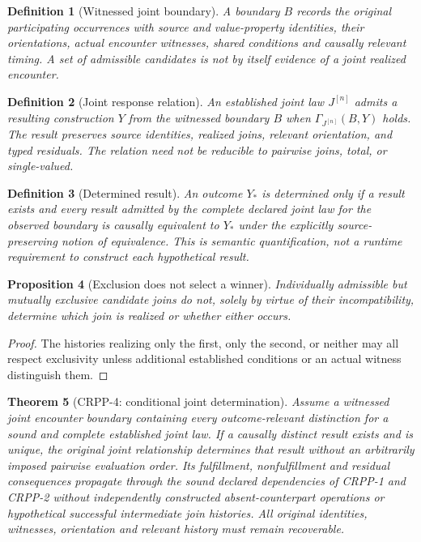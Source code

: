 \documentclass[11pt]{article}
\newtheorem{definition}{Definition}[section]
\newtheorem{proposition}[definition]{Proposition}
\newtheorem{theorem}[definition]{Theorem}
\begin{document}
\begin{definition}[Witnessed joint boundary]
A boundary $B$ records the original participating occurrences
with source and value-property identities, their orientations,
actual encounter witnesses, shared conditions and causally
relevant timing. A set of admissible candidates is not by
itself evidence of a joint realized encounter.
\end{definition}
\begin{definition}[Joint response relation]
An established joint law $J^{[n]}$ admits a resulting construction
$Y$ from the witnessed boundary $B$ when
$\Gamma_{J^{[n]}}(B,Y)$ holds. The result preserves source
identities, realized joins, relevant orientation, and typed
residuals. The relation need not be reducible to pairwise joins,
total, or single-valued.
\end{definition}
\begin{definition}[Determined result]
An outcome $Y_*$ is determined only if a result exists and
every result admitted by the complete declared joint law for
the observed boundary is causally equivalent to $Y_*$ under
the explicitly source-preserving notion of equivalence.
This is semantic quantification, not a runtime requirement
to construct each hypothetical result.
\end{definition}
\begin{proposition}[Exclusion does not select a winner]
Individually admissible but mutually exclusive candidate joins
do not, solely by virtue of their incompatibility, determine
which join is realized or whether either occurs.
\end{proposition}
\begin{proof}
The histories realizing only the first, only the second,
or neither may all respect exclusivity unless additional
established conditions or an actual witness distinguish them.
\end{proof}
\begin{theorem}[CRPP-4: conditional joint determination]
Assume a witnessed joint encounter boundary containing every
outcome-relevant distinction for a sound and complete established
joint law. If a causally distinct result exists and is unique,
the original joint relationship determines that result without
an arbitrarily imposed pairwise evaluation order. Its fulfillment,
nonfulfillment and residual consequences propagate through
the sound declared dependencies of CRPP-1 and CRPP-2 without
independently constructed absent-counterpart operations or
hypothetical successful intermediate join histories.
All original identities, witnesses, orientation and relevant
history must remain recoverable.
\end{theorem}
\end{document}
